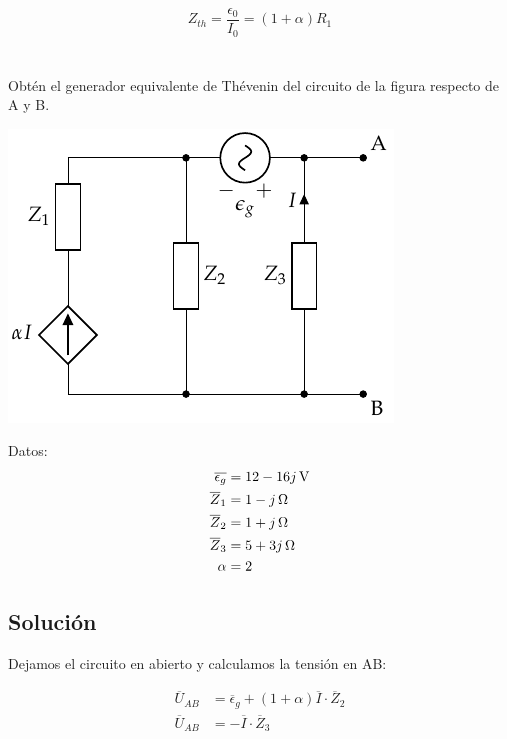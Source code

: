 \documentclass[12pt]{article}
\begin{document}
\begin{equation*}
  Z_{th} = \frac{\epsilon_0}{I_0} = (1 + \alpha) R_1
\end{equation*}

\clearpage

\section{}

Obtén el generador equivalente de Thévenin del circuito de la figura respecto de A y B.

\begin{center}
\includegraphics{../figs/Thevenin4}
\end{center}

Datos:
\begin{align*}
  \overline{\epsilon_g} &= \SI[parse-numbers=false]{12 - 16j}{\volt}\\
  \overline{Z}_1 &= \SI[parse-numbers=false]{1 - j}{\ohm}\\
  \overline{Z}_2 &= \SI[parse-numbers=false]{1 + j}{\ohm}\\
  \overline{Z}_3 &= \SI[parse-numbers=false]{5 + 3j}{\ohm}\\
  \alpha &= 2
\end{align*}

\noindent\hrulefill

\subsection*{Solución}

Dejamos el circuito en abierto y calculamos la tensión en AB:

\begin{align*}
  \overline{U}_{AB} &= \overline{\epsilon}_g + (1 + \alpha) \overline{I} \cdot \overline{Z}_2\\
  \overline{U}_{AB} &= - \overline{I} \cdot \overline{Z}_3
\end{align*}
\end{document}
